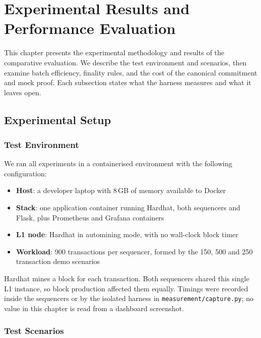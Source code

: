 \chapter{Experimental Results and Performance Evaluation}
\label{ch:evaluation}

This chapter presents the experimental methodology and results of the comparative evaluation. We describe the test environment and scenarios, then examine batch efficiency, finality rules, and the cost of the canonical commitment and mock proof. Each subsection states what the harness measures and what it leaves open.

\section{Experimental Setup}

\subsection{Test Environment}

We ran all experiments in a containerised environment with the following configuration:

\begin{itemize}
    \item \textbf{Host}: a developer laptop with 8\,GB of memory available to Docker
    \item \textbf{Stack}: one application container running Hardhat, both sequencers and Flask, plus Prometheus and Grafana containers
    \item \textbf{L1 node}: Hardhat in automining mode, with no wall-clock block timer
    \item \textbf{Workload}: 900 transactions per sequencer, formed by the 150, 500 and 250 transaction demo scenarios
\end{itemize}

Hardhat mines a block for each transaction. Both sequencers shared this single L1 instance, so block production affected them equally. Timings were recorded inside the sequencers or by the isolated harness in \texttt{measurement/capture.py}; no value in this chapter is read from a dashboard screenshot.

\subsection{Test Scenarios}

